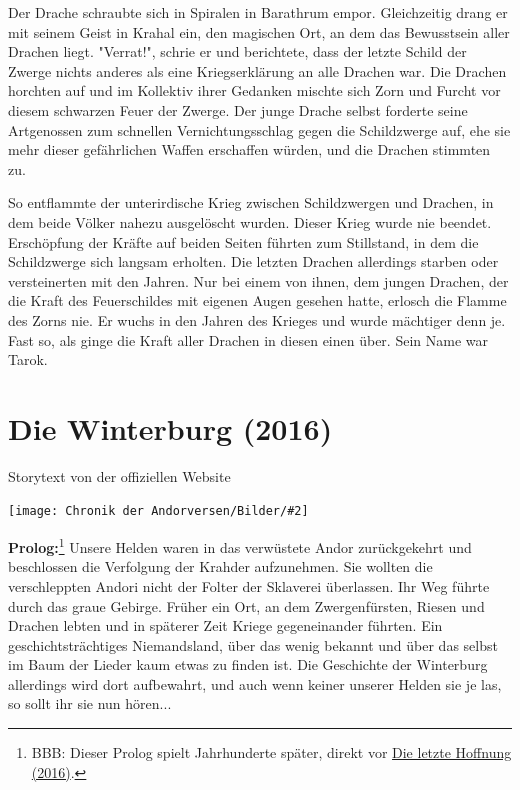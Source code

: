 \documentclass[10pt, a4paper, oneside]{book}
\newcommand{\storytext}[1]{%
    \section{#1}%
    \label{Storytext: #1}%
}
\newcommand{\refprodukt}[1]{\hyperref[Produkt: #1]{#1}}
\newcommand{\bildmitts}[2][height=0.32\textwidth,width=0.48\textwidth,keepaspectratio]{%
    \begin{center}
        \texttt{[image: Chronik der Andorversen/Bilder/\#2]}
    \end{center}
}
\begin{document}
\begin{multicols}{2}
Der Drache schraubte sich in Spiralen in Barathrum empor. Gleichzeitig drang er mit seinem Geist in Krahal ein, den magischen Ort, an dem das Bewusstsein aller Drachen liegt. "Verrat!", schrie er und berichtete, dass der letzte Schild der Zwerge nichts anderes als eine Kriegserklärung an alle Drachen war. Die Drachen horchten auf und im Kollektiv ihrer Gedanken mischte sich Zorn und Furcht vor diesem schwarzen Feuer der Zwerge. Der junge Drache selbst forderte seine Artgenossen zum schnellen Vernichtungsschlag gegen die Schildzwerge auf, ehe sie mehr dieser gefährlichen Waffen erschaffen würden, und die Drachen stimmten zu.

So entflammte der unterirdische Krieg zwischen Schildzwergen und Drachen, in dem beide Völker nahezu ausgelöscht wurden. Dieser Krieg wurde nie beendet. Erschöpfung der Kräfte auf beiden Seiten führten zum Stillstand, in dem die Schildzwerge sich langsam erholten. Die letzten Drachen allerdings starben oder versteinerten mit den Jahren. Nur bei einem von ihnen, dem jungen Drachen, der die Kraft des Feuerschildes mit eigenen Augen gesehen hatte, erlosch die Flamme des Zorns nie. Er wuchs in den Jahren des Krieges und wurde mächtiger denn je. Fast so, als ginge die Kraft aller Drachen in diesen einen über. Sein Name war Tarok.



\newpage %

\storytext{Die Winterburg (2016)}

\begin{center}
    Storytext von der offiziellen Website
\end{center}

\bildmitts{Die Winterburg (2016).jpeg}

\textbf{Prolog:}\footnote{BBB: Dieser Prolog spielt Jahrhunderte später, direkt vor \refprodukt{Die letzte Hoffnung (2016)}.} Unsere Helden waren in das verwüstete Andor zurückgekehrt und beschlossen die Verfolgung der Krahder aufzunehmen. Sie wollten die verschleppten Andori nicht der Folter der Sklaverei überlassen. Ihr Weg führte durch das graue Gebirge. Früher ein Ort, an dem Zwergenfürsten, Riesen und Drachen lebten und in späterer Zeit Kriege gegeneinander führten. Ein geschichtsträchtiges Niemandsland, über das wenig bekannt und über das selbst im Baum der Lieder kaum etwas zu finden ist. Die Geschichte der Winterburg allerdings wird dort aufbewahrt, und auch wenn keiner unserer Helden sie je las, so sollt ihr sie nun hören...


\end{multicols}
\end{document}
